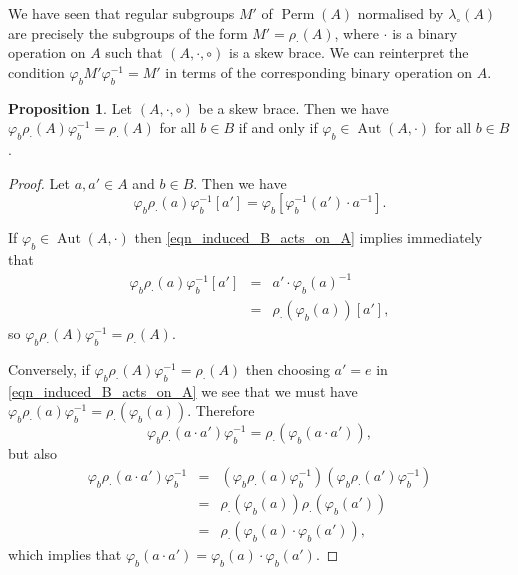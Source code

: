 \documentclass[12pt,a4paper, reqno]{amsart}
\theoremstyle{definition}
\newtheorem{proposition}[theorem]{Proposition}
\DeclareMathOperator{\Perm}{\mbox{Perm}}
\DeclareMathOperator{\Aut}{\mbox{Aut}}
\begin{document}
We have seen that regular subgroups $ M' $ of $ \Perm(A) $ normalised by $ \lambda_{\circ}(A) $ are precisely the subgroups of the form $ M'=\rho_{\cdot}(A) $, where $ \cdot $ is a binary operation on $ A $ such that $ (A,\cdot,\circ) $ is a skew brace. We can reinterpret the condition $ \varphi_{b} M' \varphi_{b}^{-1} = M' $ in terms of the corresponding binary operation on $ A $. 

\begin{proposition} \label{prop_induced_B_acts_on_A}
Let $ (A,\cdot,\circ) $ be a skew brace. Then we have $ \varphi_{b} \rho_{\cdot}(A) \varphi_{b}^{-1} = \rho_{\cdot}(A) $ for all $ b \in B $ if and only if $ \varphi_{b} \in \Aut(A,\cdot) $ for all $ b \in B $. 
\end{proposition}
\begin{proof}
Let $ a,a' \in A $ and $ b \in B $. Then we have
\begin{equation} \label{eqn_induced_B_acts_on_A}
\varphi_{b}\rho_{\cdot}(a)\varphi_{b}^{-1}[a'] = \varphi_{b}[\varphi_{b}^{-1}(a') \cdot a^{-1}].
\end{equation}

If $ \varphi_{b} \in \Aut(A,\cdot) $ then \eqref{eqn_induced_B_acts_on_A} implies immediately that 
\begin{eqnarray*}
\varphi_{b}\rho_{\cdot}(a)\varphi_{b}^{-1}[a'] & = & a' \cdot \varphi_{b}(a)^{-1} \\
& = & \rho_{\cdot}(\varphi_{b}(a))[a'],
\end{eqnarray*}
so $ \varphi_{b} \rho_{\cdot}(A) \varphi_{b}^{-1} = \rho_{\cdot}(A) $.
 
Conversely, if $ \varphi_{b} \rho_{\cdot}(A) \varphi_{b}^{-1} = \rho_{\cdot}(A) $ then choosing $ a'= e $ in \eqref{eqn_induced_B_acts_on_A} we see that we must have $ \varphi_{b} \rho_{\cdot}(a) \varphi_{b}^{-1} = \rho_{\cdot}(\varphi_{b}(a)) $. Therefore
\[ \varphi_{b} \rho_{\cdot}(a\cdot a') \varphi_{b}^{-1} = \rho_{\cdot}(\varphi_{b}(a \cdot a')), \]
but also
\begin{eqnarray*}
\varphi_{b} \rho_{\cdot}(a\cdot a') \varphi_{b}^{-1} & = & 
(\varphi_{b} \rho_{\cdot}(a) \varphi_{b}^{-1})(\varphi_{b} \rho_{\cdot}(a') \varphi_{b}^{-1}) \\
& = & \rho_{\cdot}(\varphi_{b}(a))\rho_{\cdot}(\varphi_{b}(a')) \\
& = & \rho_{\cdot}(\varphi_{b}(a) \cdot \varphi_{b}(a')), 
\end{eqnarray*}
which implies that $ \varphi_{b}(a \cdot a') = \varphi_{b}(a) \cdot \varphi_{b}(a') $. 
\end{proof}
\end{document}
